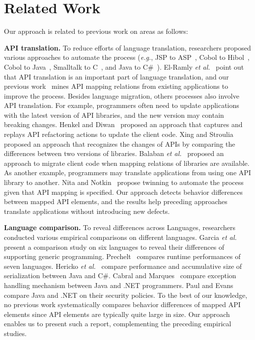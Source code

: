 \section{Related Work}
\label{sec:related}

Our approach is related to previous work on areas as follows:

\textbf{API translation.} To reduce efforts of language translation, researchers proposed various
approaches to automate the process (\emph{e.g.}, JSP to ASP~\cite{hassan2005lightweight}, Cobol to Hibol~\cite{waters1988program}, Cobol to Java~\cite{mossienko2003automated}, Smalltalk to C~\cite{yasumatsu1995spice}, and Java to C\#~\cite{el2006experiment}). El-Ramly \emph{et al.}~\cite{el2006experiment} point out that API translation is an important part of language translation, and our previous work~\cite{zhong2010mining} mines API mapping relations from existing applications to improve the process. Besides language migration, others processes also involve API translation. For example, programmers often need to update applications with the latest version of API libraries, and the new version may contain breaking changes. Henkel and Diwan~\cite{henkel2005catchup} proposed an approach that captures and replays API refactoring actions to update the client code. Xing and Stroulia~\cite{xing2007api} proposed an approach that recognizes the changes of APIs by comparing the differences between two versions of libraries. Balaban \emph{et al.}~\cite{balaban2005refactoring} proposed an approach to migrate client code when mapping relations of libraries are available. As another example, programmers may translate applications from using one API library to another. Nita and Notkin~\cite{nita2010using} propose twinning to automate the process given that API mapping is specified. Our approach detects behavior differences between mapped API elements, and the results help preceding approaches translate applications without introducing new defects.

\textbf{Language comparison.} To reveal differences across Languages, researchers conducted various empirical comparisons on different languages. Garcia \emph{et al.}~\cite{Garcia2003} present a comparison study on six languages to reveal their differences of supporting generic programming. Prechelt~\cite{prechelt2000empirical} compares runtime performances of seven languages. Hericko \emph{et al.}~\cite{944589} compare performance and accumulative size of serialization between Java and C\#. Cabral and Marques~\cite{cabral2007exception} compare exception handling mechanism between Java and .NET programmers. Paul and Evans~\cite{paul2006comparing} compare Java and .NET on their security policies. To the best of our knowledge, no previous work systematically compares behavior differences of mapped API elements since API elements are typically quite large in size. Our approach enables us to present such a report, complementing the preceding empirical studies.

